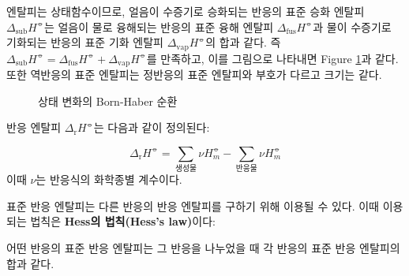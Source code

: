             \par 엔탈피는 상태함수이므로, 얼음이 수증기로 승화되는 반응의 표준 승화 엔탈피 $\Delta_{\mathrm{sub}}H^{\circlehbar}$는 얼음이 물로 융해되는 반응의 
            표준 융해 엔탈피 $\Delta_{\mathrm{fus}}H^{\circlehbar}$과 물이 수증기로 기화되는 반응의 표준 기화 엔탈피 $\Delta_{\mathrm{vap}}H^{\circlehbar}$의 
            합과 같다. 즉 $\Delta_{\mathrm{sub}}H^{\circlehbar} = \Delta_{\mathrm{fus}}H^{\circlehbar} + \Delta_{\mathrm{vap}}H^{\circlehbar}$를 만족하고, 
            이를 그림으로 나타내면 Figure \ref{f1}과 같다. 또한 역반응의 표준 엔탈피는 정반응의 표준 엔탈피와 부호가 다르고 크기는 같다.
            \begin{figure}[H]
                \centering
                \caption{상태 변화의 Born-Haber 순환}\label{f1}
            \end{figure}
            \par 반응 엔탈피 $\Delta_{\mathrm{r}}H^{\circlehbar}$는 다음과 같이 정의된다:
            \begin{defn}[반응 엔탈피]
            \begin{equation*}
                \Delta_{\mathrm{r}}H^{\circlehbar} = \sum_{\textrm{생성물}} \nu H^{\circlehbar}_{m} - \sum_{\textrm{반응물}} \nu H^{\circlehbar}_{m}
            \end{equation*}
            이때 $\nu$는 반응식의 화학종별 계수이다.
            \end{defn}
            \par 표준 반응 엔탈피는 다른 반응의 반응 엔탈피를 구하기 위해 이용될 수 있다. 이때 이용되는 법칙은 \textbf{Hess의 법칙(Hess's law)}이다:
            \begin{law}[Hess의 법칙]
                어떤 반응의 표준 반응 엔탈피는 그 반응을 나누었을 때 각 반응의 표준 반응 엔탈피의 합과 같다.
            \end{law}

